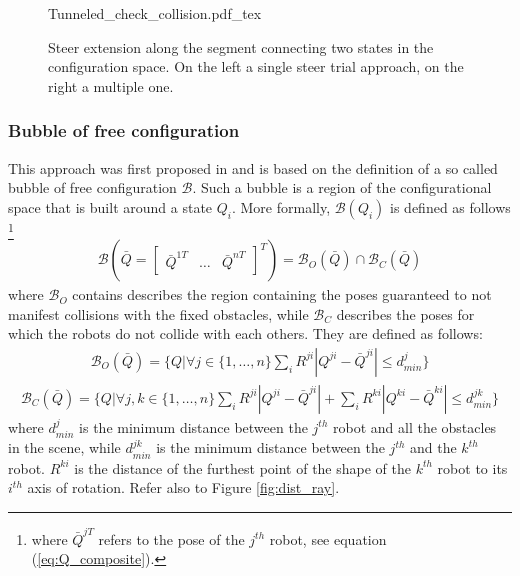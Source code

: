  \begin{figure}
	 \centering
 \def\svgwidth{0.45 \columnwidth}
 {Tunneled_check_collision.pdf_tex} 
	 \caption{Steer extension along the segment connecting two states in the configuration space. On the left a single steer trial approach, on the right a multiple one.}
 \label{fig:Tunnel_check}
 \end{figure}

\subsubsection{Bubble of free configuration}

This approach was first proposed in \cite{Bubble} and is based on the definition of a so called bubble of free configuration $\mathcal{B}$. Such a bubble is a region of the configurational space that is built around a state $Q_i$. More formally, $\mathcal{B}(Q_i)$ is defined as follows \footnote{where $\bar{Q}^{jT}$ refers to the pose of the $j^{th}$ robot, see equation (\ref{eq:Q_composite}). }
\begin{eqnarray}
\mathcal{B}(\bar{Q} = \begin{bmatrix} \bar{Q}^{1T} & \hdots & \bar{Q}^{nT} \end{bmatrix}^T) = \mathcal{B}_O(\bar{Q}) \cap \mathcal{B}_C(\bar{Q}) 
\end{eqnarray} 
where $\mathcal{B}_O$ contains describes the region containing the poses guaranteed to not manifest collisions with the fixed obstacles, while $\mathcal{B}_C$ describes the poses for which the robots do not collide with each others. They are defined as follows:
\begin{eqnarray}
\mathcal{B}_O(\bar{Q}) =  \bigg \lbrace Q  \bigg | \forall j \in \lbrace 1,\hdots,n \rbrace 
\sum_i R^{ji} | Q^{ji} - \bar{Q}^{ji} | \leq d^j_{min}
\bigg \rbrace 
\end{eqnarray}
\begin{eqnarray}
\mathcal{B}_C(\bar{Q}) =  \bigg \lbrace Q  \bigg | \forall j,k \in \lbrace 1,\hdots,n \rbrace 
\sum_i R^{ji} | Q^{ji} - \bar{Q}^{ji} | + \sum_i R^{ki} | Q^{ki} - \bar{Q}^{ki} | \leq d^{jk}_{min}
\bigg \rbrace 
\end{eqnarray}
where $d^j_{min}$ is the minimum distance between the $j^{th}$ robot and all the obstacles in the scene, while $d^{jk}_{min}$ is the minimum distance between the $j^{th}$ and the $k^{th}$ robot. $R^{ki}$ is the distance of the furthest point of the shape of the $k^{th}$ robot to its $i^{th}$ axis of rotation. Refer also to Figure \ref{fig:dist_ray}.
